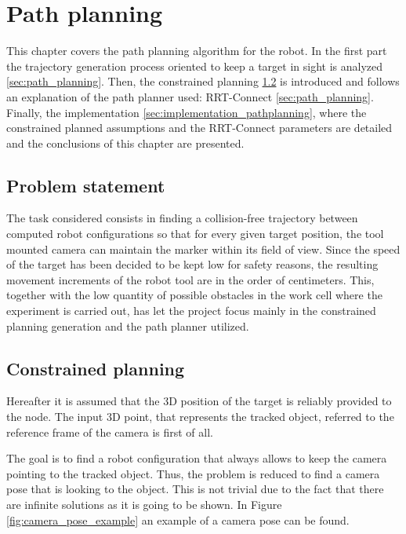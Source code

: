 \chapter{Path planning} %
\label{chap:path_planning}

This chapter covers the path planning algorithm for the robot.
In the first part the trajectory generation process oriented to keep a target in sight is analyzed \ref{sec:path_planning}. Then, the constrained planning \ref{sec:constrained_planning} is introduced and follows an explanation of the path planner used: RRT-Connect \ref{sec:path_planning}. Finally, the implementation \ref{sec:implementation_pathplanning}, where the constrained planned assumptions and the RRT-Connect parameters are detailed and the conclusions  of this chapter are presented.
\section{Problem statement} %
\label{sec:path_planning_in_keep_object_in_sight}
The task considered consists in finding a collision-free trajectory between computed robot configurations so that for every given target position, the tool mounted camera can maintain the marker within its field of view.
Since the speed of the target has been decided to be kept low for safety reasons, the resulting movement increments of the robot tool are in the order of centimeters.
This, together with the low quantity of possible obstacles in the work cell where the experiment is carried out, has let the project focus mainly in the constrained planning generation and the path planner utilized.

\section{Constrained planning} %
\label{sec:constrained_planning}
Hereafter it is assumed that the 3D position of the target is reliably provided to the node.
The input 3D point, that represents the tracked object, referred to the reference frame of the camera is first of all.

The goal is to find a robot configuration that always allows to keep the camera pointing to the tracked object.
Thus, the problem is reduced to find a camera pose that is looking to the object.
This is not trivial due to the fact that there are infinite solutions as it is going to be shown. In Figure \ref{fig:camera_pose_example} an example of a camera pose can be found.

